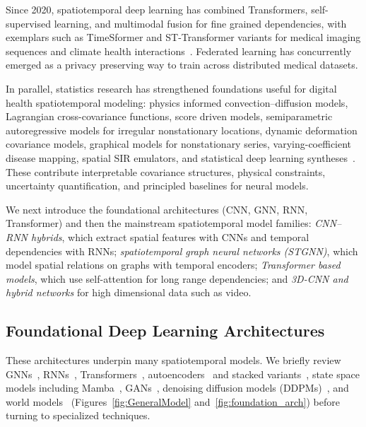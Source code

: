 \documentclass[journal]{IEEEtran}
\begin{document}
Since 2020, spatiotemporal deep learning has combined Transformers, self-supervised learning, and multimodal fusion for fine grained dependencies, with exemplars such as TimeSformer and ST-Transformer variants for medical imaging sequences and climate health interactions~\cite{liu2024temporallearning}. Federated learning has concurrently emerged as a privacy preserving way to train across distributed medical datasets.

In parallel, statistics research has strengthened foundations useful for digital health spatiotemporal modeling: physics informed convection--diffusion models, Lagrangian cross-covariance functions, score driven models, semiparametric autoregressive models for irregular nonstationary locations, dynamic deformation covariance models, graphical models for nonstationary series, varying-coefficient disease mapping, spatial SIR emulators, and statistical deep learning syntheses~\cite{liu2022convectionDiffusion,salvana2023lagrangian,gasperoni2023scoreDriven,lu2024dyfast,castroMorales2025dynamicDeformation,basu2023graphicalNonstationary,wang2024respiratoryDiseaseMapping,trostle2024spatialSIR,wikle2023statisticalDeepLearning}. These contribute interpretable covariance structures, physical constraints, uncertainty quantification, and principled baselines for neural models.

We next introduce the foundational architectures (CNN, GNN, RNN, Transformer) and then the mainstream spatiotemporal model families: \emph{CNN--RNN hybrids}, which extract spatial features with CNNs and temporal dependencies with RNNs; \emph{spatiotemporal graph neural networks (STGNN)}, which model spatial relations on graphs with temporal encoders; \emph{Transformer based models}, which use self-attention for long range dependencies; and \emph{3D-CNN and hybrid networks} for high dimensional data such as video.


\subsection{Foundational Deep Learning Architectures }
These architectures underpin many spatiotemporal models. We briefly review GNNs~\cite{scarselli2009gnn}, RNNs~\cite{rumelhart1986rnn}, Transformers~\cite{vaswani2017attention}, autoencoders~\cite{hinton2006reducing} and stacked variants~\cite{masci2011stacked}, state space models including Mamba~\cite{gu2023mamba}, GANs~\cite{goodfellow2014gan}, denoising diffusion models (DDPMs)~\cite{ho2020ddpm}, and world models~\cite{maes2026leworldmodel} (Figures~\ref{fig:GeneralModel} and~\ref{fig:foundation_arch}) before turning to specialized techniques.
\end{document}
